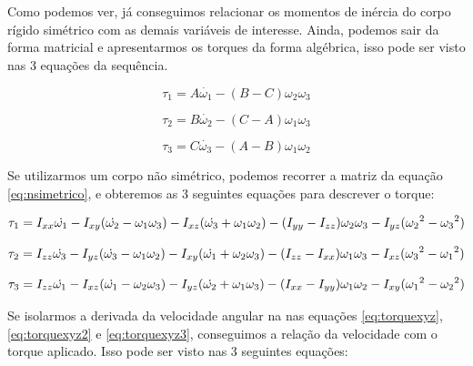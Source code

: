 Como podemos ver, já conseguimos relacionar os momentos de inércia do corpo rígido simétrico com as demais variáveis de interesse. Ainda, podemos sair da forma matricial e apresentarmos os torques da forma algébrica, isso pode ser visto nas 3 equações da sequência.

\begin{equation}
  \tau_1=A\dot{\omega_1}-(B-C)\omega_2\omega_3 
\end{equation}

\begin{equation}
  \tau_2=B\dot{\omega_2}-(C-A)\omega_1\omega_3 
\end{equation}

\begin{equation}
  \tau_3=C\dot{\omega_3}-(A-B)\omega_1\omega_2
\end{equation}

Se utilizarmos um corpo não simétrico, podemos recorrer a matriz da equação \ref{eq:nsimetrico}, e obteremos as 3 seguintes equações para descrever o torque:

\begin{equation}\label{eq:torquexyz}
 \tau_{1}=I_{xx}\dot{\omega_{1}}-I_{xy}(\dot{\omega_{2}}-\omega_{1}\omega_{3})-I_{xz}(\dot{\omega_{3}}+\omega_{1}\omega_{2})\\-(I_{yy}-I_{zz})\omega_{2}\omega_{3}-I_{yz}({\omega_{2}}^{2}-{\omega_{3}}^{2})
\end{equation}

\begin{equation}\label{eq:torquexyz2}
  \tau_{2}=I_{zz}\dot{\omega_{3}}-I_{yz}(\dot{\omega_{3}}-\omega_{1}\omega_{2})-I_{xy}(\dot{\omega_{1}}+\omega_{2}\omega_{3})\\-(I_{zz}-I_{xx})\omega_{1}\omega_{3}-I_{xz}({\omega_{3}}^{2}-{\omega_{1}}^{2})
\end{equation}

\begin{equation}\label{eq:torquexyz3}
 \tau_{3}=I_{zz}\dot{\omega_{1}}-I_{xz}(\dot{\omega_{1}}-\omega_{2}\omega_{3})-I_{yz}(\dot{\omega_{2}}+\omega_{1}\omega_{3})\\-(I_{xx}-I_{yy})\omega_{1}\omega_{2}-I_{xy}({\omega_{1}}^{2}-{\omega_{2}}^{2})
\end{equation}

Se isolarmos a derivada da velocidade angular na nas equações \ref{eq:torquexyz}, \ref{eq:torquexyz2} e \ref{eq:torquexyz3}, conseguimos a relação da velocidade com o torque aplicado. Isso pode ser visto nas 3 seguintes equações:

